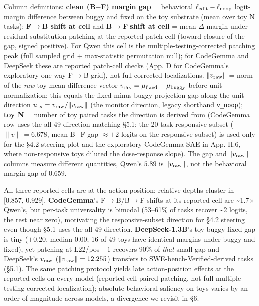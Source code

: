 \documentclass[
  11pt,
  a4paper]{article}
\begin{document}
Column definitions: \textbf{clean (B\(-\)F) margin gap} = behavioral
\(\ell_{\rm edit} - \ell_{\rm noop}\) logit-margin difference between
buggy and fixed on the toy substrate (mean over toy N tasks);
\textbf{F\(\to\)B shift at cell} and \textbf{B\(\to\)F shift at cell} =
mean \(\Delta\)-margin under residual-substitution patching at the
reported patch cell (toward closure of the gap, signed positive). For
Qwen this cell is the multiple-testing-corrected patching peak (full
sampled grid + max-statistic permutation null); for CodeGemma and
DeepSeek these are reported patch-cell checks (App. D for CodeGemma's
exploratory one-way F\(\to\)B grid), not full corrected localizations.
\textbf{\(\|v_{\rm raw}\|\)} = norm of the \emph{raw} toy
mean-difference vector
\(v_{\rm raw} = \mu_{\rm fixed} - \mu_{\rm buggy}\) before unit
normalization; this equals the fixed-minus-buggy projection gap along
the unit direction \(u_{\rm tx} = v_{\rm raw} /
\|v_{\rm raw}\|\) (the monitor direction, legacy shorthand
\texttt{v\_noop}); \textbf{toy N} = number of toy paired tasks the
direction is derived from (CodeGemma row uses the all-49 direction
matching \S{}5.1; the 20-task responsive subset (\(\|v\|=6.678\), mean
B\(-\)F gap \(\approx +2\) logits on the responsive subset) is used only
for the \S{}4.2 steering plot and the exploratory CodeGemma SAE in App.
H.6, where non-responsive toys diluted the dose-response slope). The gap
and \(\|v_{\rm raw}\|\) columns measure different quantities, Qwen's
\(5.89\) is \(\|v_{\rm raw}\|\), not the behavioral margin gap of
\(0.659\).

All three reported cells are at the action position; relative depths
cluster in {[}0.857, 0.929{]}. \textbf{CodeGemma}'s F\(\to\)B/B\(\to\)F
shifts at its reported cell are \textasciitilde1.7\ensuremath{\times} Qwen's, but per-task
universality is bimodal (53--61\% of tasks recover \textasciitilde2
logits, the rest near zero), motivating the responsive-subset direction
for \S{}4.2 steering even though \S{}5.1 uses the all-49 direction.
\textbf{DeepSeek-1.3B}'s toy buggy-fixed gap is tiny (\(+0.20\), median
0.00; 16 of 49 toys have identical margins under buggy and fixed), yet
patching at L22/pos \(-1\) recovers 90\% of \emph{that} small gap and
DeepSeek's \(v_{\rm raw}\) (\(\|v_{\rm raw}\|=12.255\)) transfers to
SWE-bench-Verified-derived tasks (\S{}5.1). The same patching protocol
yields late action-position effects at the reported cells on every model
(reported-cell paired-patching, not full multiple-testing-corrected
localization); absolute behavioral-saliency on toys varies by an order
of magnitude across models, a divergence we revisit in \S{}6.
\end{document}
